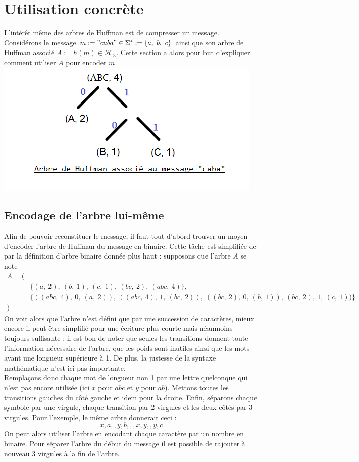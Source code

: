 \documentclass[a4paper, 12pt]{article}
\begin{document}
\newpage

\section{Utilisation concrète}
L'intérêt même des arbres de Huffman est de compresser un message. Considérons le message $m := "caba" \in\Sigma^* := \{a,\ b,\ c\}$ ainsi que son arbre de Huffman associé $A:=h(m)\in\overline{\mathcal{H}_\Sigma}$. Cette section a alors pour but d'expliquer comment utiliser $A$ pour encoder $m$. \\
\includegraphics[width=\linewidth]{treecaba.png}

\subsection{Encodage de l'arbre lui-même}
Afin de pouvoir reconstituer le message, il faut tout d'abord trouver un moyen d'encoder l'arbre de Huffman du message en binaire. Cette tâche est simplifiée de par la définition d'arbre binaire donnée plus haut : supposons que l'arbre $A$ se note
\begin{align*}
A = (& \\
	&\{(a,\ 2),\ (b,\ 1),\ (c,\ 1),\ (bc,\ 2),\ (abc,\ 4)\}, \\
	&\{((abc,\ 4),\ 0,\ (a,\ 2)),\ ((abc,\ 4),\ 1,\ (bc,\ 2)),\ ((bc,\ 2),\ 0,\ (b,\ 1)),\ (bc,\ 2),\ 1,\ (c,\ 1))\} \\
)&
\end{align*}
On voit alors que l'arbre n'est défini que par une succession de caractères, mieux encore il peut être simplifié pour une écriture plus courte mais néanmoins toujours suffisante :
il est bon de noter que seules les transitions donnent toute l'information nécessaire de l'arbre, que les poids sont inutiles ainsi que les mots ayant une longueur supérieure à 1. De plus, la justesse de la syntaxe mathématique n'est ici pas importante. \\
Remplaçons donc chaque mot de longueur non 1 par une lettre quelconque qui n'est pas encore utilisée (ici $x$ pour $abc$ et $y$ pour $ab$). Mettons toutes les transitions gauches du côté gauche et idem pour la droite. Enfin, séparons chaque symbole par une virgule, chaque transition par 2 virgules et les deux côtés par 3 virgules. Pour l'exemple, le même arbre donnerait ceci :
$$
x,a,,y,b,,,x,y,,y,c
$$
On peut alors utiliser l'arbre en encodant chaque caractère par un nombre en binaire. Pour séparer l'arbre du début du message il est possible de rajouter à nouveau 3 virgules à la fin de l'arbre.
\end{document}
